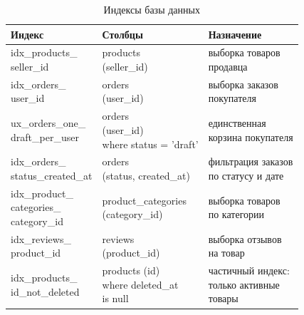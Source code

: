 \begin{table}[H]
    \caption{Индексы базы данных}
    \label{tbl:indexes}
    \begin{tabular}{|l|l|l|}
        \hline
        \textbf{Индекс} & \textbf{Столбцы} & \textbf{Назначение} \\ \hline
        \makecell[l]{idx\_products\_\\seller\_id} & \makecell[l]{products\\(seller\_id)} & \makecell[l]{выборка товаров\\продавца} \\ \hline
        \makecell[l]{idx\_orders\_\\user\_id} & \makecell[l]{orders\\(user\_id)} & \makecell[l]{выборка заказов\\покупателя} \\ \hline
        \makecell[l]{ux\_orders\_one\_\\draft\_per\_user} & \makecell[l]{orders\\(user\_id)\\where status = 'draft'} & \makecell[l]{единственная\\корзина покупателя} \\ \hline
        \makecell[l]{idx\_orders\_\\status\_created\_at} & \makecell[l]{orders\\(status, created\_at)} & \makecell[l]{фильтрация заказов\\по статусу и дате} \\ \hline
        \makecell[l]{idx\_product\_\\categories\_\\category\_id} & \makecell[l]{product\_categories\\(category\_id)} & \makecell[l]{выборка товаров\\по категории} \\ \hline
        \makecell[l]{idx\_reviews\_\\product\_id} & \makecell[l]{reviews\\(product\_id)} & \makecell[l]{выборка отзывов\\на товар} \\ \hline
        \makecell[l]{idx\_products\_\\id\_not\_deleted} & \makecell[l]{products (id)\\where deleted\_at\\is null} & \makecell[l]{частичный индекс:\\только активные\\товары} \\ \hline

\end{tabular}
\end{table}
